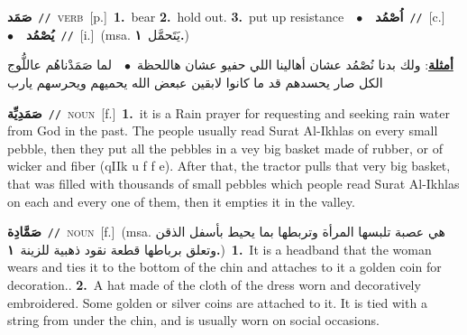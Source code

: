 \documentclass[10pt,a4paper,twoside]{article} %
\begin{document}
\begin{multicols}{2}
{\setlength\topsep{0pt}\textbf{\foreignlanguage{arabic}{صَمَد}}\ {\color{gray}\texttt{//}\color{black}}\ \textsc{verb}\ [p.]\ \textbf{1.}~bear  \textbf{2.}~hold out.  \textbf{3.}~put up resistance\ \ $\bullet$\ \ \setlength\topsep{0pt}\textbf{\foreignlanguage{arabic}{اُصْمُد}}\ {\color{gray}\texttt{//}\color{black}}\ [c.]\ \ $\bullet$\ \ \setlength\topsep{0pt}\textbf{\foreignlanguage{arabic}{يُصْمُد}}\ {\color{gray}\texttt{//}\color{black}}\ [i.]\ \color{gray}(msa. \foreignlanguage{arabic}{يَتَحمَّل}~\foreignlanguage{arabic}{\textbf{١.}})\color{black}\  \begin{flushright}\color{gray}\foreignlanguage{arabic}{\textbf{\underline{\foreignlanguage{arabic}{أمثلة}}}: ولك بدنا نُصْمُد عشان أهالينا اللي حفيو عشان هاللحظة\ $\bullet$\ \  لما صَمَدْناهُم عاللُّوج الكل صار يحسدهم قد ما كانوا لابقين عبعض الله يحميهم ويحرسهم يارب}\end{flushright}\color{black}} \vspace{2mm}

{\setlength\topsep{0pt}\textbf{\foreignlanguage{arabic}{صَمَدِيِّة}}\ {\color{gray}\texttt{//}\color{black}}\ \textsc{noun}\ [f.]\ \textbf{1.}~it is a Rain prayer for requesting and seeking rain water from God in the past. The people usually read Surat Al-Ikhlas on every small pebble, then they put all the pebbles in a vey big basket made of rubber, or of wicker and fiber (qIIk u f f e). After that, the tractor pulls that very big basket, that was filled with thousands of small pebbles which people read Surat Al-Ikhlas on each and every one of them, then it empties it in the valley.\ } \vspace{2mm}

{\setlength\topsep{0pt}\textbf{\foreignlanguage{arabic}{صَمَّادِة}}\ {\color{gray}\texttt{//}\color{black}}\ \textsc{noun}\ [f.]\ \color{gray}(msa. \foreignlanguage{arabic}{هي عصبة تلبسها المرأة وتربطها بما يحيط بأسفل الذقن وتعلق برباطها قطعة نقود ذهبية للزينة}~\foreignlanguage{arabic}{\textbf{١.}})\color{black}\ \textbf{1.}~It is a headband that the woman wears and ties it to the bottom of the chin and attaches to it a golden coin for decoration..  \textbf{2.}~A hat made of the cloth of the dress worn and decoratively embroidered. Some golden or silver coins are attached to it. It is tied with a string from under the chin, and is usually worn on social occasions.\ } \vspace{2mm}


\end{multicols}
\end{document}
